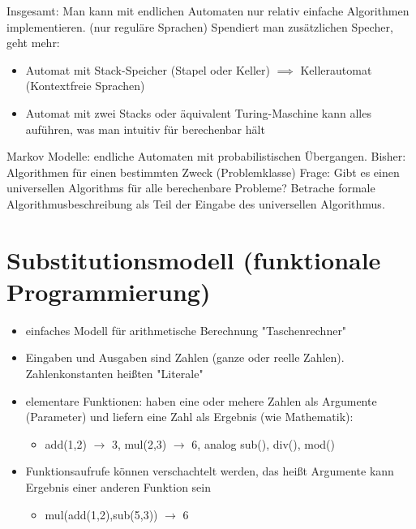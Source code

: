\documentclass[a4paper]{scrartcl}
\theoremstyle{definition}
\theoremstyle{plain}
\theoremstyle{remark}
\theoremstyle{remark}
\begin{document}
Insgesamt: Man kann mit endlichen Automaten nur relativ einfache Algorithmen implementieren. (nur reguläre Sprachen)
Spendiert man zusätzlichen Specher, geht mehr:
\begin{itemize}
\item Automat mit Stack-Speicher (Stapel oder Keller) $\implies$ Kellerautomat (Kontextfreie Sprachen)
\item Automat mit zwei Stacks oder äquivalent Turing-Maschine kann alles auführen, was man intuitiv für berechenbar hält
\end{itemize}
Markov Modelle: endliche Automaten mit probabilistischen Übergangen.
Bisher: Algorithmen für einen bestimmten Zweck (Problemklasse)
Frage: Gibt es einen universellen Algorithms für alle berechenbare Probleme?
Betrache formale Algorithmusbeschreibung als Teil der Eingabe des universellen Algorithmus.
\section{Substitutionsmodell (funktionale Programmierung)}
\label{sec-4}
\begin{itemize}
\item einfaches Modell für arithmetische Berechnung "Taschenrechner"
\item Eingaben und Ausgaben sind Zahlen (ganze oder reelle Zahlen). Zahlenkonstanten heißten "Literale"
\item elementare Funktionen: haben eine oder mehere Zahlen als Argumente (Parameter) und liefern eine Zahl als Ergebnis (wie Mathematik):
\begin{itemize}
\item add(1,2) $\rightarrow$ 3, mul(2,3) $\rightarrow$ 6, analog sub(), div(), mod()
\end{itemize}
\item Funktionsaufrufe können verschachtelt werden, das heißt Argumente kann Ergebnis einer anderen Funktion sein
\begin{itemize}
\item mul(add(1,2),sub(5,3)) $\rightarrow$ 6
\end{itemize}
\end{itemize}
\end{document}
